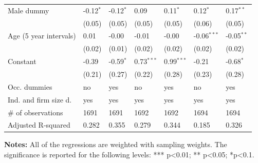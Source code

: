 \begin{table}[H]
\begin{centering}
{\begin{tabular}{lllllll}
Male dummy & -0.12$^{*}$ & -0.12$^{*}$ & 0.09 & 0.11$^{*}$ & 0.12$^{*}$ & 0.17$^{**}$\tabularnewline
 & (0.05) & (0.05) & (0.05) & (0.05) & (0.06) & (0.05)\tabularnewline
Age (5 year intervals) & 0.01 & -0.00 & -0.01 & -0.00 & -0.06$^{***}$ & -0.05$^{**}$\tabularnewline
 & (0.02) & (0.01) & (0.02) & (0.02) & (0.02) & (0.02)\tabularnewline
Constant & -0.39 & -0.59$^{*}$ & 0.73$^{***}$ & 0.99$^{***}$ & -0.21 & -0.68$^{*}$\tabularnewline
 & (0.21) & (0.27) & (0.22) & (0.28) & (0.23) & (0.28)\tabularnewline
Occ. dummies & no & yes & no & yes & no & yes\tabularnewline
Ind. and firm size d. & yes & yes & yes & yes & yes & yes\tabularnewline
\# of observations & 1691 & 1691 & 1692 & 1692 & 1694 & 1694\tabularnewline
Adjusted R-squared & 0.282 & 0.355 & 0.279 & 0.344 & 0.185 & 0.326\tabularnewline
\bottomrule
\end{tabular}}
\par\end{centering}
\medskip

\textbf{Notes:} All of the regressions are weighted with sampling
weights. The significance is reported for the following levels: {*}{*}{*}
p<0.01; {*}{*} p<0.05; {*}p<0.1.
\end{table}
